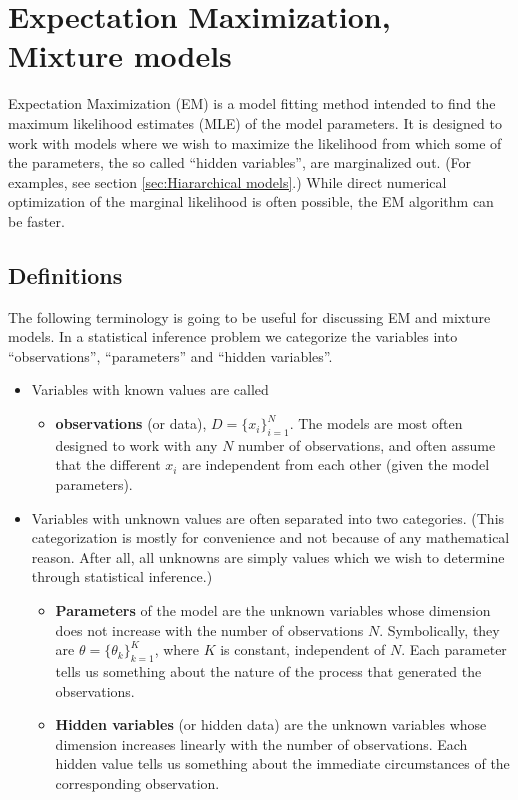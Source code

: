 \newpage
\section{Expectation Maximization, Mixture models}
\label{sec:EM}
Expectation Maximization (EM) is a model fitting method intended to find the maximum likelihood estimates (MLE) of the model parameters. It is designed to work with models where we wish to maximize the likelihood from which some of the parameters, the so called ``hidden variables'', are marginalized out. (For examples, see section \ref{sec:Hiararchical models}.) While direct numerical optimization of the marginal likelihood is often possible, the EM algorithm can be faster.

\subsection{Definitions}
The following terminology is going to be useful for discussing EM and mixture models. In a statistical inference problem we categorize the variables into ``observations'', ``parameters'' and ``hidden variables''.
\begin{itemize}
	\item Variables with known values are called
		\begin{itemize}
			\item {\bf observations} (or data), $D = \{x_i\}_{i=1}^N$. The models are most often designed to work with any $N$ number of observations, and often assume that the different $x_i$ are independent from each other (given the model parameters).
		\end{itemize}
	\item Variables with unknown values are often separated into two categories. (This categorization is mostly for convenience and not because of any mathematical reason. After all, all unknowns are simply values which we wish to determine through statistical inference.)
		\begin{itemize}
			\item {\bf Parameters} of the model are the unknown variables whose dimension does not increase with the number of observations $N$. Symbolically, they are $\theta = \{\theta_k\}_{k=1}^K$, where $K$ is constant, independent of $N$. Each parameter tells us something about the nature of the process that generated the observations.
			\item {\bf Hidden variables} (or hidden data) are the unknown variables whose dimension increases linearly with the number of observations. Each hidden value tells us something about the immediate circumstances of the corresponding observation.
		\end{itemize}
\end{itemize}
